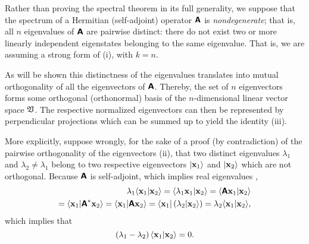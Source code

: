 {\color{OliveGreen}
\bproof
Rather than proving the spectral theorem in its full generality,
we suppose that the spectrum of a Hermitian (self-adjoint) operator $ \textsf{\textbf{A}}$ is {\em nondegenerate};
that is, all $n$ eigenvalues of $\textsf{\textbf{A}}$ are pairwise distinct:
there do not exist two or more linearly independent eigenstates belonging to the same eigenvalue.
That is, we are assuming a strong form of (i), with $k=n$.

As will be shown this distinctness of the eigenvalues translates into mutual orthogonality of all the eigenvectors of $ \textsf{\textbf{A}}$.
Thereby, the set of $n$ eigenvectors forms some orthogonal (orthonormal) basis of the $n$-dimensional linear vector space $\frak V$.
The respective normalized eigenvectors can then be represented by perpendicular projections which can be summed up to yield the identity
(iii).

More explicitly, suppose wrongly, for the sake of a proof (by contradiction) of the pairwise orthogonality of the eigenvectors (ii),
that two distinct eigenvalues
$\lambda_1$
and
$\lambda_2 \neq \lambda_1$
belong to two respective eigenvectors
$\vert {\bf x}_1\rangle $
and
$\vert {\bf x}_2\rangle $
which are not orthogonal.
Because $\textsf{\textbf{A}}$ is self-adjoint, which implies  real eigenvalues
,
\begin{equation}
\begin{split}
\lambda_1  \langle {\bf x}_1 \vert {\bf x}_2 \rangle =
\langle \lambda_1  {\bf x}_1 \vert {\bf x}_2 \rangle =
  \langle \textsf{\textbf{A}}{\bf x}_1 \vert {\bf x}_2 \rangle \\=
  \langle {\bf x}_1 \vert \textsf{\textbf{A}}^\ast  {\bf x}_2 \rangle =
  \langle {\bf x}_1 \vert \textsf{\textbf{A}}{\bf x}_2 \rangle =
  \langle {\bf x}_1\vert \left( \lambda_2 \vert {\bf x}_2 \rangle \right)=
  \lambda_2 \langle {\bf x}_1 \vert {\bf x}_2 \rangle,
\end{split}
\end{equation}
which implies that
\begin{equation}
\left(\lambda_1 - \lambda_2\right)
\langle {\bf x}_1 \vert {\bf x}_2 \rangle
=
0
.
\label{2016-m-ch-fdvs-ecfo}
\end{equation}

}
